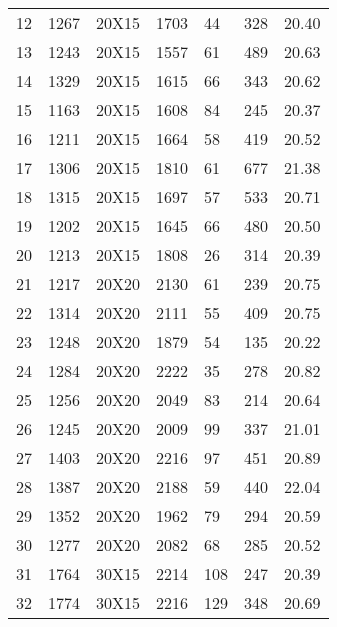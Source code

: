 \documentclass[14pt]{acmsiggraph}
\begin{document}
\begin{table}[h!]
\begin{center}
{\begin{tabular}{lllllll||}
					12  & 1267 & 20X15  & \cellcolor[rgb]{0.82,0.84,0.43}1703 & 44  & 328  & 20.40 \\
					13  & 1243 & 20X15  & \cellcolor[rgb]{0.72,0.8,0.39}1557  & 61  & 489  & 20.63 \\
					14  & 1329 & 20X15  & \cellcolor[rgb]{0.67,0.78,0.38}1615 & 66  & 343  & 20.62 \\
					15  & 1163 & 20X15  & \cellcolor[rgb]{0.86,0.86,0.45}1608 & 84  & 245  & 20.37 \\
					16  & 1211 & 20X15  & \cellcolor[rgb]{0.85,0.85,0.45}1664 & 58  & 419  & 20.52 \\
					17  & 1306 & 20X15  & \cellcolor[rgb]{0.87,0.86,0.46}1810 & 61  & 677  & 21.38 \\
					18  & 1315 & 20X15  & \cellcolor[rgb]{0.76,0.81,0.41}1697 & 57  & 533  & 20.71 \\
					19  & 1202 & 20X15  & \cellcolor[rgb]{0.85,0.85,0.45}1645 & 66  & 480  & 20.50 \\
					20  & 1213 & 20X15  & \cellcolor[rgb]{0.98,0.91,0.5}1808  & 26  & 314  & 20.39 \\
					21  & 1217 & 20X20  & \cellcolor[rgb]{1,0.46,0.25}2130    & 61  & 239  & 20.75 \\
					22  & 1314 & 20X20  & \cellcolor[rgb]{1,0.72,0.4}2111     & 55  & 409  & 20.75 \\
					23  & 1248 & 20X20  & \cellcolor[rgb]{1,0.91,0.51}1879    & 54  & 135  & 20.22 \\
					24  & 1284 & 20X20  & \cellcolor[rgb]{1,0.49,0.28}2222    & 35  & 278  & 20.82 \\
					25  & 1256 & 20X20  & \cellcolor[rgb]{1,0.68,0.38}2049    & 83  & 214  & 20.64 \\
					26  & 1245 & 20X20  & \cellcolor[rgb]{1,0.71,0.4}2009     & 99  & 337  & 21.01 \\
					27  & 1403 & 20X20  & \cellcolor[rgb]{1,0.77,0.43}2216    & 97  & 451  & 20.89 \\
					28  & 1387 & 20X20  & \cellcolor[rgb]{1,0.78,0.43}2188    & 59  & 440  & 22.04 \\
					29  & 1352 & 20X20  & \cellcolor[rgb]{0.94,0.89,0.49}1962 & 79  & 294  & 20.59 \\
					30  & 1277 & 20X20  & \cellcolor[rgb]{1,0.68,0.38}2082    & 68  & 285  & 20.52 \\
					31  & 1764 & 30X15  & \cellcolor[rgb]{0.72,0.8,0.4}2214   & 108 & 247  & 20.39 \\
					32  & 1774 & 30X15  & \cellcolor[rgb]{0.71,0.79,0.39}2216 & 129 & 348  & 20.69 \\

\end{tabular}}
\end{center}
\end{table}
\end{document}
